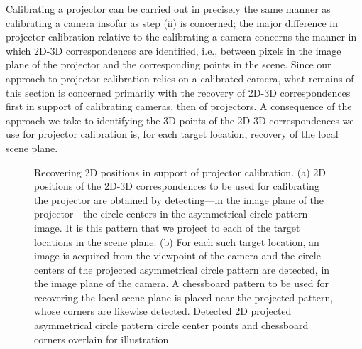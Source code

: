 \documentclass[review]{elsarticle}
\begin{document}
Calibrating a projector \cite{moreno2012simple,zhang2009projector,zhang2006novel} can be carried out in precisely the same manner as calibrating a camera insofar as step (ii) is concerned; the major difference in projector calibration relative to the calibrating a camera concerns the manner in which 2D-3D correspondences are identified, i.e., between pixels in the image plane of the projector and the corresponding points in the scene. Since our approach to projector calibration relies on a calibrated camera, what remains of this section is concerned primarily with the recovery of 2D-3D correspondences first in support of calibrating cameras, then of projectors. A consequence of the approach we take to identifying the 3D points of the 2D-3D correspondences we use for projector calibration is, for each target location, recovery of the local scene plane. 

\begin{figure}
    \centering
    \qquad
    \caption{Recovering 2D positions in support of projector calibration. (a) 2D positions of the 2D-3D correspondences to be used for calibrating the projector are obtained by detecting---in the image plane of the projector---the circle centers in the asymmetrical circle pattern image. It is this pattern that we project to each of the target locations in the scene plane. (b) For each such target location, an image is acquired from the viewpoint of the camera and the circle centers of the projected asymmetrical circle pattern are detected, in the image plane of the camera. A chessboard pattern to be used for recovering the local scene plane is placed near the projected pattern, whose corners are likewise detected. Detected 2D projected asymmetrical circle pattern circle center points and chessboard corners overlain for illustration.}
    \label{fig:2d}
\end{figure}
\end{document}
